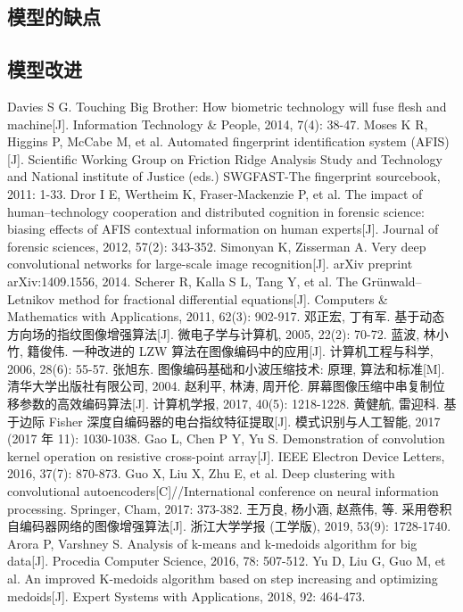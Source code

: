 \documentclass{whutmod}
\begin{document}
\begin{itemize}
		\subsection{模型的缺点}

  		\subsection{模型改进}

  
  
 
	\newpage	%
	\nocite{*}		%
	\begin{thebibliography}{9}%
		Davies S G. Touching Big Brother: How biometric technology will fuse flesh and machine[J]. Information Technology \& People, 2014, 7(4): 38-47.
	Moses K R, Higgins P, McCabe M, et al. Automated fingerprint identification system (AFIS)[J]. Scientific Working Group on Friction Ridge Analysis Study and Technology and National institute of Justice (eds.) SWGFAST-The fingerprint sourcebook, 2011: 1-33.
	Dror I E, Wertheim K, Fraser‐Mackenzie P, et al. The impact of human–technology cooperation and distributed cognition in forensic science: biasing effects of AFIS contextual information on human experts[J]. Journal of forensic sciences, 2012, 57(2): 343-352.
	Simonyan K, Zisserman A. Very deep convolutional networks for large-scale image recognition[J]. arXiv preprint arXiv:1409.1556, 2014.
	Scherer R, Kalla S L, Tang Y, et al. The Grünwald–Letnikov method for fractional differential equations[J]. Computers \& Mathematics with Applications, 2011, 62(3): 902-917.
	邓正宏, 丁有军. 基于动态方向场的指纹图像增强算法[J]. 微电子学与计算机, 2005, 22(2): 70-72.
	蓝波, 林小竹, 籍俊伟. 一种改进的 LZW 算法在图像编码中的应用[J]. 计算机工程与科学, 2006, 28(6): 55-57.
	张旭东. 图像编码基础和小波压缩技术: 原理, 算法和标准[M]. 清华大学出版社有限公司, 2004.
	赵利平, 林涛, 周开伦. 屏幕图像压缩中串复制位移参数的高效编码算法[J]. 计算机学报, 2017, 40(5): 1218-1228.
	黄健航, 雷迎科. 基于边际 Fisher 深度自编码器的电台指纹特征提取[J]. 模式识别与人工智能, 2017 (2017 年 11): 1030-1038.
	Gao L, Chen P Y, Yu S. Demonstration of convolution kernel operation on resistive cross-point array[J]. IEEE Electron Device Letters, 2016, 37(7): 870-873.
	Guo X, Liu X, Zhu E, et al. Deep clustering with convolutional autoencoders[C]//International conference on neural information processing. Springer, Cham, 2017: 373-382.
	 王万良, 杨小涵, 赵燕伟, 等. 采用卷积自编码器网络的图像增强算法[J]. 浙江大学学报 (工学版), 2019, 53(9): 1728-1740.
	Arora P, Varshney S. Analysis of k-means and k-medoids algorithm for big data[J]. Procedia Computer Science, 2016, 78: 507-512.
	Yu D, Liu G, Guo M, et al. An improved K-medoids algorithm based on step increasing and optimizing medoids[J]. Expert Systems with Applications, 2018, 92: 464-473.
	\end{thebibliography}


\end{itemize}
\end{document}
